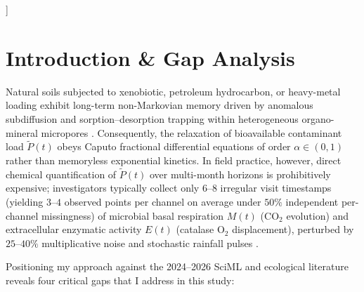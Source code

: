 \documentclass[10pt,twocolumn,a4paper]{article}
\begin{document}
\begin{@twocolumnfalse}
\begin{abstract}
      \noindent\textbf{Keywords:} Kolmogorov-Arnold Networks; Fractional Calculus; Mittag-Leffler Function; Pad\'e Approximant; Amortized Simulation-Based Inference; Soil Bioindication; Haldane Kinetics.
    \end{abstract}
    \vspace*{4mm}
  \end{@twocolumnfalse}
]

\section{Introduction \& Gap Analysis}

Natural soils subjected to xenobiotic, petroleum hydrocarbon, or heavy-metal loading exhibit long-term non-Markovian memory driven by anomalous subdiffusion and sorption--desorption trapping within heterogeneous organo-mineral micropores \cite{schumer2003}. Consequently, the relaxation of bioavailable contaminant load $\tilde{P}(t)$ obeys Caputo fractional differential equations of order $\alpha \in (0, 1)$ rather than memoryless exponential kinetics. In field practice, however, direct chemical quantification of $\tilde{P}(t)$ over multi-month horizons is prohibitively expensive; investigators typically collect only $6\text{--}8$ irregular visit timestamps (yielding $3\text{--}4$ observed points per channel on average under $50\%$ independent per-channel missingness) of microbial basal respiration $M(t)$ ($\text{CO}_2$ evolution) and extracellular enzymatic activity $E(t)$ (catalase $\text{O}_2$ displacement), perturbed by $25\text{--}40\%$ multiplicative noise and stochastic rainfall pulses \cite{kolesnikov2021ag,mdpienzymes2024,mdpi2024oxidoreductases}.

Positioning my approach against the 2024--2026 SciML and ecological literature reveals four critical gaps that I address in this study:
\end{document}
